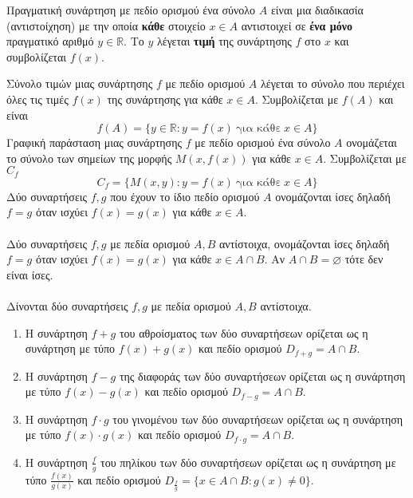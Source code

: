 \documentclass[ektypwsh]{frontisthrio}
\begin{document}
Πραγματική συνάρτηση με πεδίο ορισμού ένα σύνολο $ A $ είναι μια διαδικασία (αντιστοίχηση) με την οποία \textbf{κάθε} στοιχείο $ x\in A $ αντιστοιχεί σε \textbf{ένα μόνο} πραγματικό αριθμό $ y\in\mathbb{R} $. Το $ y $ λέγεται \textbf{τιμή} της συνάρτησης $ f $ στο $ x $ και συμβολίζεται $ f(x) $.
\begin{center}
\centering
{}
\end{center}
Σύνολο τιμών μιας συνάρτησης $ f $ με πεδίο ορισμού $ A $ λέγεται το σύνολο που περιέχει όλες τις τιμές $ f(x) $ της συνάρτησης για κάθε  $ x\in A $. Συμβολίζεται με $ f(A) $ και είναι
\[ f(A)=\{y\in\mathbb{R}:y=f(x)\ \textrm{για κάθε}\ x\in A\} \]
Γραφική παράσταση μιας συνάρτησης $ f $ με πεδίο ορισμού ένα σύνολο $ A $ ονομάζεται το σύνολο των σημείων της μορφής $ M(x,f(x)) $ για κάθε $ x\in A $. Συμβολίζεται με $ C_f $
\[ C_f=\{M(x,y):y=f(x)\ \textrm{για κάθε}\ x\in A\} \]
Δύο συναρτήσεις $ f,g $ που έχουν το ίδιο πεδίο ορισμού $ A $ ονομάζονται ίσες δηλαδή $ f=g $ όταν ισχύει $ f(x)=g(x) $ για κάθε $ x\in A $.\\\\
Δύο συναρτήσεις $ f,g $ με πεδία ορισμού $ A,B $ αντίστοιχα, ονομάζονται ίσες δηλαδή $ f=g $ όταν ισχύει $ f(x)=g(x) $ για κάθε $ x\in A\cap B $. Αν $ A\cap B=\varnothing $ τότε δεν είναι ίσες.\\\\
Δίνονται δύο συναρτήσεις $ f,g $ με πεδία ορισμού $ A,B $ αντίστοιχα. 
\begin{enumerate}
\item Η συνάρτηση $ f+g $ του αθροίσματος των δύο συναρτήσεων ορίζεται ως η συνάρτηση με τύπο $ f(x)+g(x) $ και πεδίο ορισμού $ D_{f+g}=A\cap B $.
\item Η συνάρτηση $ f-g $ της διαφοράς των δύο συναρτήσεων ορίζεται ως η συνάρτηση με τύπο $ f(x)-g(x) $ και πεδίο ορισμού $ D_{f-g}=A\cap B $.
\item Η συνάρτηση $ f\cdot g $ του γινομένου των δύο συναρτήσεων ορίζεται ως η συνάρτηση με τύπο $ f(x)\cdot g(x) $ και πεδίο ορισμού $ D_{f\cdot g}=A\cap B $.
\item Η συνάρτηση $ \frac{f}{g} $ του πηλίκου των δύο συναρτήσεων ορίζεται ως η συνάρτηση με τύπο $ \frac{f(x)}{g(x)} $ και πεδίο ορισμού $ D_{\frac{f}{g}}=\{x\in A\cap B:g(x)\neq 0\} $.
\end{enumerate}
\end{document}
